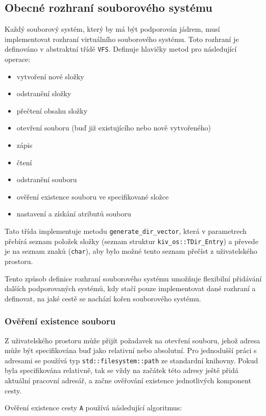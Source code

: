\documentclass[12pt, a4paper]{article}
\begin{document}
\subsection{Obecné rozhraní souborového systému}
Každý souborový systém, který by má být podporován jádrem, musí implementovat rozhraní virtuálního souborového systému. Toto rozhraní je definováno v abstraktní třídě \texttt{VFS}. Definuje hlavičky metod pro následující operace:
\begin{itemize}
    \item vytvoření nové složky
    \item odstranění složky
    \item přečtení obsahu složky
    \item otevření souboru (buď již existujícího nebo nově vytvořeného)
    \item zápis
    \item čtení
    \item odstranění souboru
    \item ověření existence souboru ve specifikované složce 
    \item nastavení a získání atributů souboru 
\end{itemize}

Tato třída implementuje metodu \texttt{generate\_dir\_vector}, která v parametrech přebírá seznam položek složky (seznam struktur \texttt{kiv\_os::TDir\_Entry}) a převede je na seznam znaků (\texttt{char}), aby bylo možné tento seznam přečíst z uživatelského prostoru.

Tento způsob definice rozhraní souborového systému umožňuje flexibilní přidávání dalších podporovaných systémů, kdy stačí pouze implementovat dané rozhraní a definovat, na jaké cestě se nachází kořen souborového systému. 

\subsubsection{Ověření existence souboru}
Z uživatelského prostoru může přijít požadavek na otevření souboru, jehož adresa může být specifikována buď jako relativní nebo absolutní. Pro jednodušší práci s adresami se používá typ \texttt{std::filesystem::path} ze standardní knihovny. Pokud byla specifikována relativně, tak se vždy na začátek této adresy ještě přidá aktuální pracovní adresář, a začne ověřování existence jednotlivých komponent cesty.

\noindent Ověření existence cesty \texttt{A} používá následující algoritmus:
\end{document}
